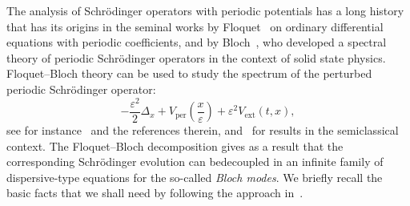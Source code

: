 \documentclass[10pt]{amsart}
\theoremstyle{definition}
\DeclareMathOperator{\ext}{ext}
\DeclareMathOperator{\per}{per}
\newcommand*\eps{\varepsilon}
\numberwithin{equation}{section}
\begin{document}
The analysis of Schr\"odinger operators with periodic potentials has a long history that has its origins in the seminal works by Floquet~\cite{Floquet1883} on ordinary differential equations with periodic coefficients, and by Bloch~\cite{Bloch28}, who developed a spectral theory of periodic Schr\"odinger operators in the context of solid state physics. Floquet--Bloch theory can be used to study the spectrum of the perturbed periodic Schr\"odinger operator:
\[
-\frac{\eps^2}{2}\Delta_x+V_{\per}\left(\frac{x}{\eps}\right)+\eps^2V_{\ext}(t,x),
\]
see for instance~\cite{Kuch01,Kuch04,Kuch16,RS:V4} and the references therein, and~\cite{GMS91,HW11,Out:87} for results in the semiclassical context. The Floquet--Bloch decomposition gives as a result that the corresponding Schr\"odinger evolution can be\linebreak decoupled in an infinite family of dispersive-type equations for the so-called \emph{Bloch modes}. We briefly recall the basic facts that we shall need by following the approach in~\cite{Ge91,GMS91}.

\end{document}
